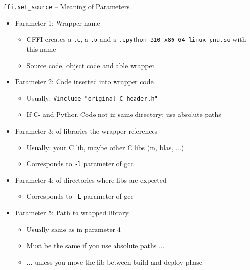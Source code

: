 \begin{frame}[fragile]{\texttt{ffi.set\_source} -- Meaning of Parameters}
%
\begin{itemize}
\item Parameter 1: Wrapper name
	\begin{itemize}
	\item CFFI creates a \texttt{.c}, a \texttt{.o} and a \texttt{.cpython-310-x86\_64-linux-gnu.so} with this name
	\item Source code, object code and able wrapper
	\end{itemize}
\item Parameter 2: Code inserted into wrapper code
	\begin{itemize}
	\item Usually: \texttt{#include "original_C_header.h"}
	\item If C- and Python Code not in same directory: use absolute paths
	\end{itemize}
\item Parameter 3:  of libraries the wrapper references
	\begin{itemize}
	\item Usually: your C lib, maybe other C libs (m, blas, ...)
	\item Corresponds to \texttt{-l} parameter of gcc
	\end{itemize}
\item Parameter 4:  of directories where libs are expected
	\begin{itemize}
	\item Corresponds to \texttt{-L} parameter of gcc
	\end{itemize}
\item Parameter 5: Path to wrapped library
	\begin{itemize}
	\item Usually same as in parameter 4
	\item Must be the same if you use absolute paths ...
	\item ... unless you move the lib between build and deploy phase
	\end{itemize}
\end{itemize}
%
\end{frame}



